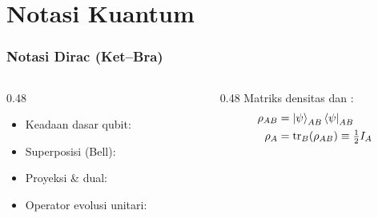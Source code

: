 \section{Notasi Kuantum}

\begin{frame}[fragile]
  \frametitle{Notasi Dirac (Ket--Bra)}

  \begin{columns}[T]
    \begin{column}{0.48\textwidth}
      \begin{itemize}
        \item Keadaan dasar qubit:
        \item Superposisi (Bell):
        \item Proyeksi \& dual:
        \item Operator evolusi unitari:
      \end{itemize}
    \end{column}
    \hfill
    \begin{column}{0.48\textwidth}
      {\small
      Matriks densitas dan :
      \begin{align*}
        \rho_{AB} &= \ketsub{\psi}{AB}\brasub{\psi}{AB} \\
        \rho_A    &= \tr_B(\rho_{AB}) \equiv \tfrac{1}{2} I_A \\

\end{align*}}
\end{column}
\end{columns}
\end{frame}
